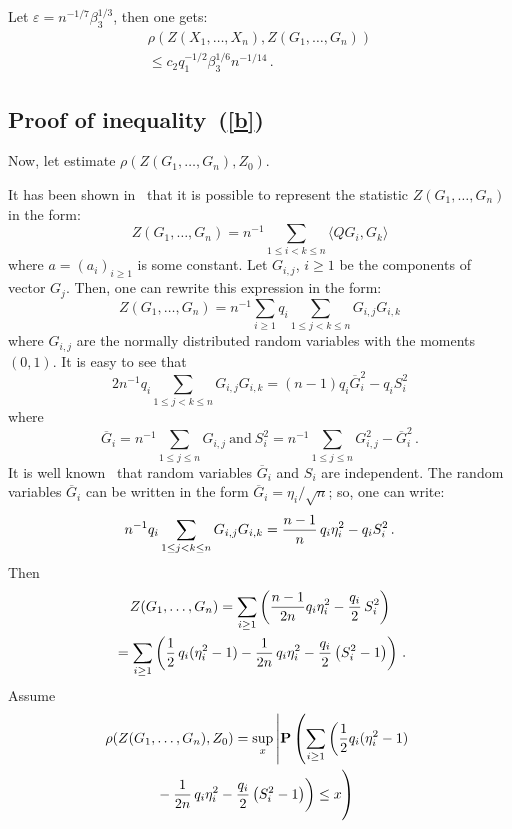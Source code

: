 \begin{multicols}{2}
   \pagebreak


\noindent
   Let $\varepsilon= n^{-1/7}\beta_3^{1/3}$, then one gets:
  \begin{multline*}
   \rho(Z(X_1,\ldots,X_n),Z(G_1,\ldots,G_n))\\
   {}\leq
   c_2q_1^{-1/2}\beta_3^{1/6}n^{-1/14}\,.
   \end{multline*}
   
    \subsection{Proof of inequality~(\ref{b})}

\noindent
   Now, let estimate $\rho(Z(G_1,\ldots,G_n),Z_0).$

   It has been shown in~\cite{1-y} that it is possible to represent the statistic
   $Z(G_1,\ldots,G_n)$ in the form:
   $$
   Z(G_1,\ldots,G_n)=n^{-1} \sum\limits_{1\leq i<k\leq n}\langle Q G_i,G_k\rangle
$$
    where $a=(a_i)_{i\geq 1}$ is some constant. Let $G_{i,j}$,  $i \geq 1$ be the components
    of vector $G_{j}$. Then, one can rewrite this expression in the form:
    $$
    Z(G_1,\ldots,G_n)= n^{-1}\sum\limits_{i\geq 1}q_i
    \sum\limits_{1\leq j<k\leq n} G_{i,j}G_{i,k}
    $$
    where $G_{i,j}$ are the normally distributed random variables with the moments $(0,1)$.
        It is easy to see that
        $$
    2n^{-1}q_i\sum\limits_{1\leq j<k\leq n} G_{i,j}G_{i,k}=(n-1)q_i\overline{G}_i^{2}-
    q_iS_i^{2}
        $$
    where
    $$
    \overline{G}_i=n^{-1}\sum\limits_{1\leq j\leq n}G_{i,j} \
    \mbox{and} \ S_i^{2}=n^{-1}\sum\limits_{1\leq j\leq n}G_{i,j}^{2}-\overline{G}_i^{2}\,.
    $$
    It is well known~\cite{2-y} that random variables $\overline{G}_i$ and $S_i$
    are independent. The random variables $\overline{G}_i$ can be written in the form
    $\overline{G}_i =\eta_i/\sqrt{n}$; so, one can write:
    $$
    n^{-1}q_i\sum\limits_{1\leq j<k\leq n} G_{i,j}G_{i,k}=
    \displaystyle\frac{\displaystyle n-1\mathstrut}{\displaystyle n\mathstrut}\,q_i\eta_i^{2}-q_iS_i^{2}\,.
    $$
    Then
    \begin{multline*}
    Z(G_1,\ldots,G_n)= \sum\limits_{i\geq 1}\left(
    \displaystyle\frac{\displaystyle n-1\mathstrut}{\displaystyle 2n\mathstrut}q_i\eta_i^{2}-\displaystyle\frac{\displaystyle q_i\mathstrut}{\displaystyle 2\mathstrut}\,S_i^{2}\right)\\
{}=\sum\limits_{i\geq 1}\left(\displaystyle\frac{\displaystyle 1\mathstrut}{\displaystyle 2\mathstrut}\,q_i(\eta_i^{2}-1)-
    \displaystyle\frac{\displaystyle 1\mathstrut}{\displaystyle 2n\mathstrut}\,q_i\eta_i^{2}-\displaystyle\frac{\displaystyle q_i\mathstrut}{\displaystyle 2\mathstrut}\left(S_i^{2}-1\right)\right)\,.
    \end{multline*}
    Assume
    \begin{multline*}
    \rho(Z(G_1,\ldots,G_n),Z_0)
=\sup\limits_{x}
    \left\vert\mathbf{P}\left(\sum\limits_{i\geq 1}\left(\fr{1}{2}q_i
    (\eta_i^{2}-1)\right.\right.\right.\\
\left.\left.    {}-
    \fr{1}{2n}\,q_i\eta_i^{2}-\fr{q_i}{2}\left(S_i^{2}-1\right) \right)\leq x
    \vphantom{\sum\limits_{i\leq1}}\right)\hspace*{3mm}
        \end{multline*}
    

\end{multicols}
